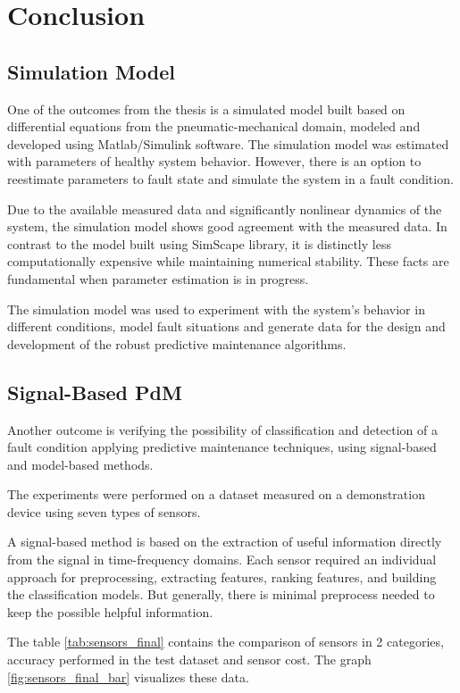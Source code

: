 \chapter{Conclusion}

\section{Simulation Model}
One of the outcomes from the thesis is a simulated model built based on
differential equations from the pneumatic-mechanical domain, modeled and
developed using Matlab/Simulink software. The simulation model was
estimated with parameters of healthy system behavior. However, there is an
option to reestimate parameters to fault state and simulate the system in a
fault condition. 

Due to the available measured data and significantly nonlinear dynamics of
the system, the simulation model shows good agreement with the measured
data. In contrast to the model built using SimScape library, it is
distinctly less computationally expensive while maintaining numerical
stability. These facts are fundamental when parameter estimation is in
progress.

The simulation model was used to experiment with the system's behavior
in different conditions, model fault situations and generate data for the
design and development of the robust predictive maintenance algorithms. 


\section{Signal-Based PdM}
Another outcome is verifying the possibility of classification and
detection of a fault condition applying predictive maintenance techniques,
using signal-based and model-based methods.

The experiments were performed on a dataset measured on a demonstration
device using seven types of sensors.
  

A signal-based method is based on the extraction of useful information
directly from the signal in time-frequency domains. Each sensor required an
individual approach for preprocessing, extracting features, ranking
features, and building the classification models. But generally, there is
minimal preprocess needed to keep the possible helpful information. 

The table \ref{tab:sensors_final} contains the comparison of sensors in 2 categories, accuracy
performed in the test dataset and sensor cost. The graph
\ref{fig:sensors_final_bar} visualizes these data.

